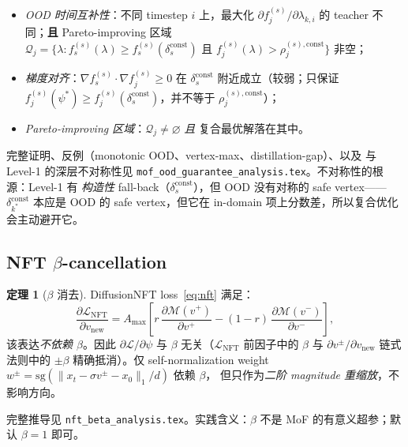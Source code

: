 \documentclass[11pt,a4paper]{article}
\newcommand{\loss}{\mathcal{L}}
\newcommand{\const}{\mathrm{const}}
\theoremstyle{definition}
\newtheorem{theorem}{定理}
\begin{document}
\begin{itemize}[leftmargin=1.5em]
\item[(A)] \emph{OOD 时间互补性}：不同 timestep $i$ 上，最大化
$\partial f_j^{(s)} / \partial \lambda_{k, i}$ 的 teacher 不同；\textbf{且}
Pareto-improving 区域
$\mathcal{Q}_j = \{\lambda: f_s^{(s)}(\lambda) \geq f_s^{(s)}(\delta_s^{\const})
\text{ 且 } f_j^{(s)}(\lambda) > \rho_j^{(s),\const}\}$ 非空；
\item[(B)] \emph{梯度对齐}：$\nabla f_s^{(s)} \cdot \nabla f_j^{(s)} \geq 0$
在 $\delta_s^{\const}$ 附近成立（较弱；只保证
$f_j^{(s)}(\psi^*) \geq f_j^{(s)}(\delta_s^{\const})$，并不等于
$\rho_j^{(s),\const}$）；
\item[(C)] \emph{Pareto-improving 区域}：$\mathcal{Q}_j \neq \varnothing$
\emph{且} 复合最优解落在其中。
\end{itemize}

完整证明、反例（monotonic OOD、vertex-max、distillation-gap）、以及
与 Level-1 的深层不对称性见
\texttt{mof\_ood\_guarantee\_analysis.tex}。不对称性的根源：Level-1 有
\emph{构造性} fall-back（$\delta_s^{\const}$），但 OOD 没有对称的 safe
vertex——$\delta_{k^*}^{\const}$ 本应是 OOD 的 safe vertex，但它在
in-domain 项上分数差，所以复合优化会主动避开它。

\subsection{NFT $\beta$-cancellation}
\label{ssec:beta_cancel}

\begin{theorem}[$\beta$ 消去]
\label{thm:beta_cancel}
DiffusionNFT loss~\eqref{eq:nft} 满足：
\begin{equation}
\frac{\partial \loss_{\text{NFT}}}{\partial v_{\text{new}}}
= A_{\max}\!\left[
r\,\frac{\partial \mathcal{M}(v^+)}{\partial v^+}
- (1-r)\,\frac{\partial \mathcal{M}(v^-)}{\partial v^-}
\right],
\end{equation}
该表达\emph{不依赖 $\beta$}。因此 $\partial \loss / \partial \psi$ 与
$\beta$ 无关（$\loss_{\text{NFT}}$ 前因子中的 $\beta$ 与
$\partial v^\pm / \partial v_{\text{new}}$ 链式法则中的 $\pm \beta$
精确抵消）。仅 self-normalization weight
$w^\pm = \mathrm{sg}(\|x_t - \sigma v^\pm - x_0\|_1 / d)$ 依赖 $\beta$，
但只作为\emph{二阶 magnitude 重缩放}，不影响方向。
\end{theorem}

完整推导见 \texttt{nft\_beta\_analysis.tex}。实践含义：$\beta$ 不是
MoF 的有意义超参；默认 $\beta = 1$ 即可。
\end{document}
